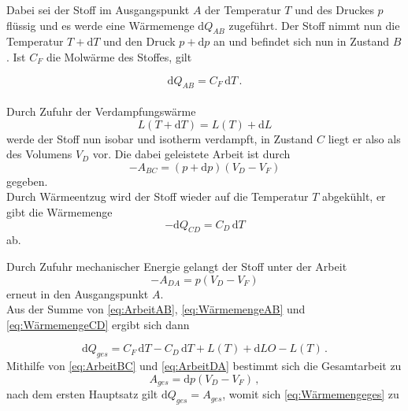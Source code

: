 Dabei sei der Stoff im Ausgangspunkt $A$ der Temperatur $T$ und des Druckes $p$ flüssig und es werde eine Wärmemenge $\mathrm{d}Q_{AB}$ zugeführt.
Der Stoff nimmt nun die Temperatur $T + \mathrm{d}T$ und den Druck $p + \mathrm{d}p$ an und befindet sich nun in Zustand $B$.
Ist $C_F$ die Molwärme des Stoffes, gilt

\begin{equation}
    \mathrm{d}Q_{AB} = C_F \, \mathrm{d}T \,.
    \label{eq:ArbeitAB}
\end{equation}\\

Durch Zufuhr der Verdampfungswärme
\begin{equation}
    L(T + \mathrm{d}T) = L(T) + \mathrm{d}L
    \label{eq:WärmemengeAB}
\end{equation}
werde der Stoff nun isobar und isotherm verdampft, in Zustand $C$ liegt er also als des Volumens $V_D$ vor.
Die dabei geleistete Arbeit ist durch
\begin{equation}
    -A_{BC} = (p + \mathrm{d}p)(V_D - V_F)
    \label{eq:ArbeitBC}
\end{equation}
gegeben. \\

Durch Wärmeentzug wird der Stoff wieder auf die Temperatur $T$ abgekühlt, er gibt die Wärmemenge
\begin{equation}
    -\mathrm{d}Q_{CD} = C_D \,\mathrm{d}T
    \label{eq:WärmemengeCD}
\end{equation}
ab.

Durch Zufuhr mechanischer Energie gelangt der Stoff unter der Arbeit
\begin{equation}
    -A_{DA} = p (V_D - V_F)
    \label{eq:ArbeitDA}
\end{equation} 
erneut in den Ausgangspunkt $A$. \\

Aus der Summe von \eqref{eq:ArbeitAB}, \eqref{eq:WärmemengeAB} und \eqref{eq:WärmemengeCD} ergibt sich dann

\begin{equation}
    \mathrm{d}Q_{ges} = C_F \, \mathrm{d}T - C_D \, \mathrm{d}T + L(T) + \mathrm{d}LO - L(T) \,.
    \label{eq:Wärmemengeges}
\end{equation}
Mithilfe von \eqref{eq:ArbeitBC} und \eqref{eq:ArbeitDA} bestimmt sich die Gesamtarbeit zu
\begin{equation*}
    A_{ges} = \mathrm{d}p (V_D - V_F) \,,
\end{equation*} nach dem ersten Hauptsatz gilt $\mathrm{d}Q_{ges} = A_{ges}$, womit sich \eqref{eq:Wärmemengeges} zu 

